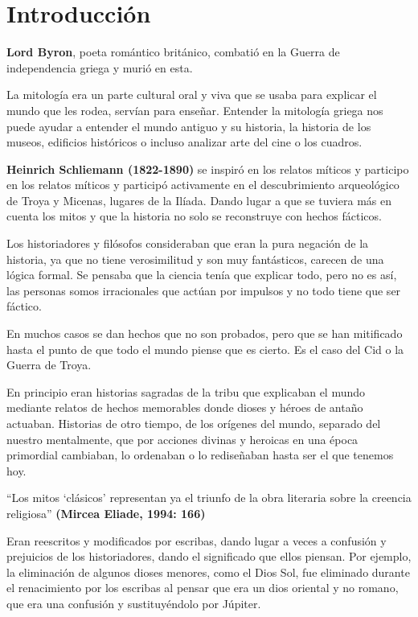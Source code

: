 \chapter{Introducción}\label{ch:introduccion}
\textbf{Lord Byron}, poeta romántico británico, combatió en la Guerra de independencia griega y murió en esta.

La mitología era un parte cultural oral y viva que se usaba para explicar el mundo que les rodea, servían para enseñar. Entender la mitología griega nos puede ayudar a entender el mundo antiguo y su historia, la historia de los museos, edificios históricos o incluso analizar arte del cine o los cuadros.

\textbf{Heinrich Schliemann (1822-1890)} se inspiró en los relatos míticos y participo en los relatos míticos y participó activamente en el descubrimiento arqueológico de Troya y Micenas, lugares de la Ilíada. Dando lugar a que se tuviera más en cuenta los mitos y que la historia no solo se reconstruye con hechos fácticos.

Los historiadores y filósofos consideraban que eran la pura negación de la historia, ya que no tiene verosimilitud y son muy fantásticos, carecen de una lógica formal. Se pensaba que la ciencia tenía que explicar todo, pero no es así, las personas somos irracionales que actúan por impulsos y no todo tiene que ser fáctico.

En muchos casos se dan hechos que no son probados, pero que se han mitificado hasta el punto de que todo el mundo piense que es cierto. Es el caso del Cid o la Guerra de Troya.

En principio eran historias sagradas de la tribu que explicaban el mundo mediante relatos de hechos memorables donde dioses y héroes de antaño actuaban. Historias de otro tiempo, de los orígenes del mundo, separado del nuestro mentalmente, que por acciones divinas y heroicas en una época primordial cambiaban, lo ordenaban o lo rediseñaban hasta ser el que tenemos hoy.

\enquote{Los mitos \enquote{clásicos} representan ya el triunfo de la obra literaria sobre la creencia religiosa} \textbf{(Mircea Eliade, 1994: 166)}

Eran reescritos y modificados por escribas, dando lugar a veces a confusión y prejuicios de los historiadores, dando el significado que ellos piensan. Por ejemplo, la eliminación de algunos dioses menores, como el Dios Sol, fue eliminado durante el renacimiento por los escribas al pensar que era un dios oriental y no romano, que era una confusión y sustituyéndolo por Júpiter.

